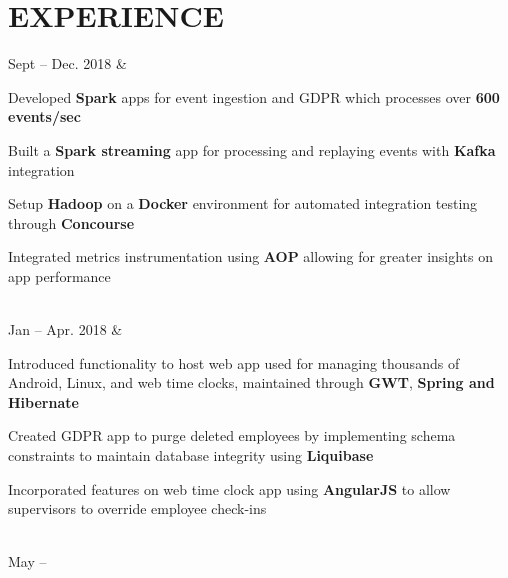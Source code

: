\documentclass[]{richard-dang}
\begin{document}
\section*{\faGroup \hspace{\FAspace} EXPERIENCE}
\begin{tabularcv}
    Sept – \newline 
    Dec. 2018   &  
                    \href{https://www.ultimatesoftware.com}{
                    }
                    \begin{tabitemize}
                        \item Developed \textbf{Spark} apps for event ingestion and GDPR which processes over \textbf{600 events/sec}
                        \item Built a \textbf{Spark streaming} app for processing and replaying events with \textbf{Kafka} integration
                        \item Setup \textbf{Hadoop} on a \textbf{Docker} environment for automated integration testing through \textbf{Concourse}
                        \item Integrated metrics instrumentation using \textbf{AOP} allowing for greater insights on app performance 
                    \end{tabitemize} 
                    \\[\vspacepar] 
    Jan – \newline 
    Apr. 2018   &  
                    \href{https://www.ultimatesoftware.com}{
                    }
                    \begin{tabitemize}
                        \item Introduced functionality to host web app used for managing thousands of Android, Linux, and web time clocks, maintained through \textbf{GWT}, \textbf{Spring and Hibernate}
                        \item Created GDPR app to purge deleted employees by implementing schema constraints to maintain database integrity using \textbf{Liquibase}
                        \item Incorporated features on web time clock app using \textbf{AngularJS} to allow supervisors to override employee check-ins
                    \end{tabitemize} 
                    \\[\vspacepar] 
    May – \newline 

\end{tabularcv}
\end{document}
